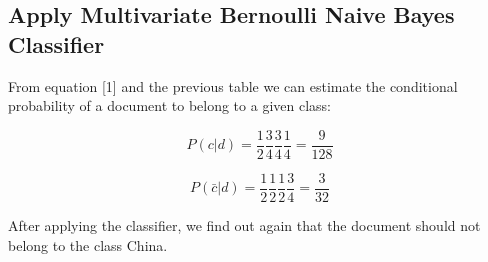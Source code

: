\subsection{Apply Multivariate Bernoulli Naive Bayes Classifier}
From equation [1] and the previous table we can estimate the conditional probability of a document to belong to a given class:

\begin{equation}
    P(c|d) = \frac{1}{2}\frac{3}{4}\frac{3}{4}\frac{1}{4} = \frac{9}{128} 
\end{equation}

\begin{equation}
    P(\bar{c}|d) = \frac{1}{2}\frac{1}{2}\frac{1}{2}\frac{3}{4} = \frac{3}{32}
\end{equation}

After applying the classifier, we find out again that the document should not belong to the class China.